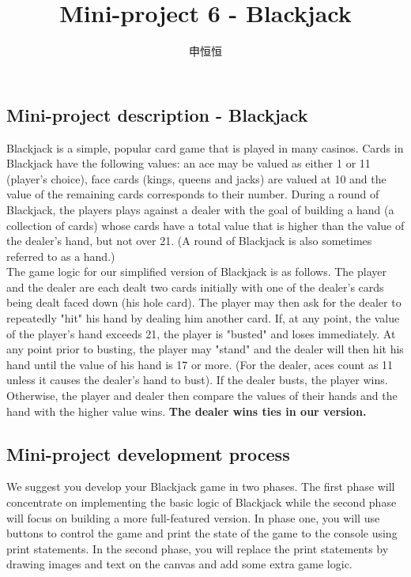 \documentclass[a4paper,14pt]{article}
\title{Mini-project 6 - Blackjack}
\author{申恒恒}
\begin{document}
\begin{CJK}{UTF8}{gkai}
\maketitle

\section*{Mini-project description - Blackjack}

\noindent Blackjack is a simple, popular card game that is played in many casinos. Cards in Blackjack have the following values: an ace may be valued as either 1 or 11 (player's choice), face cards (kings, queens and jacks) are valued at 10 and the value of the remaining cards corresponds to their number. During a round of Blackjack, the players plays against a dealer with the goal of building a hand (a collection of cards) whose cards have a total value that is higher than the value of the dealer's hand, but not over 21.  (A round of Blackjack is also sometimes referred to as a hand.)
\\

\noindent The game logic for our simplified version of Blackjack is as follows. The player and the dealer are each dealt two cards initially with one of the dealer's cards being dealt faced down (his hole card). The player may then ask for the dealer to repeatedly "hit" his hand by dealing him another card. If, at any point, the value of the player's hand exceeds 21, the player is "busted" and loses immediately. At any point prior to busting, the player may "stand" and the dealer will then hit his hand until the value of his hand is 17 or more. (For the dealer, aces count as 11 unless it causes the dealer's hand to bust). If the dealer busts, the player wins. Otherwise, the player and dealer then compare the values of their hands and the hand with the higher value wins. \textbf{The dealer wins ties in our version.}

\subsection*{Mini-project development process} 

\noindent We suggest you develop your Blackjack game in two phases. The first phase will concentrate on implementing the basic logic of Blackjack while the second phase will focus on building a more full-featured version. In phase one, you will use buttons to control the game and print the state of the game to the console using print statements. In the second phase, you will replace the print statements by drawing images and text on the canvas and add some extra game logic.
\\


\end{CJK}
\end{document}
